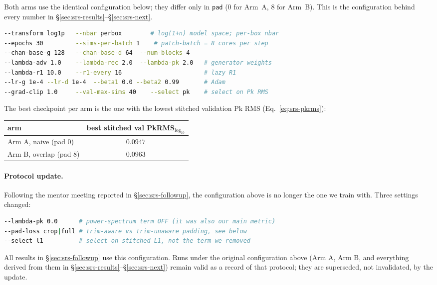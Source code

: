 Both arms use the identical configuration below; they differ only in \texttt{pad}
($0$ for Arm~A, $8$ for Arm~B). This is the configuration behind every number
in \S\ref{sec:srs-results}--\S\ref{sec:srs-next}.

\begin{lstlisting}[language=bash]
--transform log1p   --nbar perbox        # log(1+n) model space; per-box nbar
--epochs 30         --sims-per-batch 1    # patch-batch = 8 cores per step
--chan-base-g 128   --chan-base-d 64  --num-blocks 4
--lambda-adv 1.0    --lambda-rec 2.0  --lambda-pk 2.0   # generator weights
--lambda-r1 10.0    --r1-every 16                       # lazy R1
--lr-g 1e-4 --lr-d 1e-4  --beta1 0.0 --beta2 0.99       # Adam
--grad-clip 1.0     --val-max-sims 40    --select pk    # select on Pk RMS
\end{lstlisting}

The best checkpoint per arm is the one with the lowest stitched validation Pk RMS
(Eq.~\ref{eq:srs-pkrms}):

\begin{center}
\begin{tabular}{lc}
\toprule
arm & best stitched val PkRMS$_{\log_{10}}$ \\
\midrule
Arm A, naive (pad $0$)  & $0.0947$ \\
Arm B, overlap (pad $8$) & $0.0963$ \\
\bottomrule
\end{tabular}
\end{center}

\paragraph{Protocol update.} Following the mentor meeting reported in
\S\ref{sec:srs-followup}, the configuration above is no longer the one we train
with. Three settings changed:
\begin{lstlisting}[language=bash]
--lambda-pk 0.0      # power-spectrum term OFF (it was also our main metric)
--pad-loss crop|full # trim-aware vs trim-unaware padding, see below
--select l1          # select on stitched L1, not the term we removed
\end{lstlisting}
All results in \S\ref{sec:srs-followup} use this configuration. Runs under the
original configuration above (Arm A, Arm B, and everything derived from them in
\S\ref{sec:srs-results}--\S\ref{sec:srs-next}) remain valid as a record of that
protocol; they are superseded, not invalidated, by the update.

